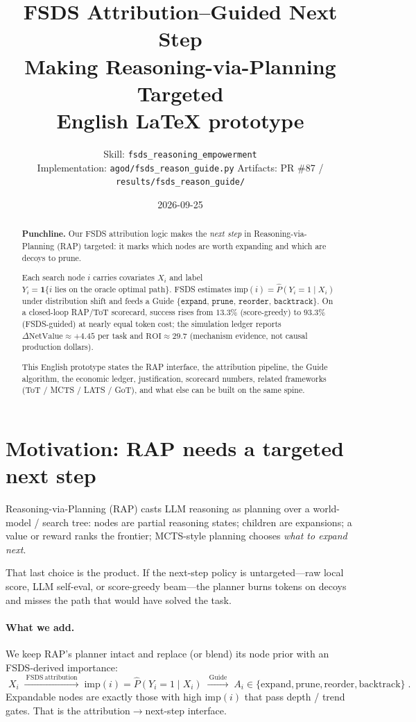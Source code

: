 \documentclass[11pt]{article}
\title{\textbf{FSDS Attribution--Guided Next Step}\\[0.4em]
\large Making Reasoning-via-Planning Targeted\\[0.15em]
\large English LaTeX prototype}
\author{Skill: \texttt{fsds\_reasoning\_empowerment}\\
Implementation: \texttt{agod/fsds\_reason\_guide.py} \quad
Artifacts: PR \#87 / \texttt{results/fsds\_reason\_guide/}}
\date{2026-09-25}
\newcommand{\imp}{\mathrm{imp}}
\newcommand{\NV}{\mathrm{NetValue}}
\newcommand{\ROI}{\mathrm{ROI}}
\newcommand{\ind}{\mathbf{1}}
\newcommand{\Phat}{\widehat{P}}
\begin{document}
\maketitle

\begin{abstract}
\textbf{Punchline.}
Our FSDS attribution logic makes the \emph{next step} in
Reasoning-via-Planning (RAP) targeted: it marks which nodes are worth
expanding and which are decoys to prune.

Each search node $i$ carries covariates $X_i$ and label
$Y_i=\ind\{i\text{ lies on the oracle optimal path}\}$.
FSDS estimates $\imp(i)=\Phat(Y_i{=}1\mid X_i)$ under distribution shift
and feeds a Guide
$\{\texttt{expand},\,\texttt{prune},\,\texttt{reorder},\,\texttt{backtrack}\}$.
On a closed-loop RAP/ToT scorecard, success rises from $13.3\%$
(score-greedy) to $93.3\%$ (FSDS-guided) at nearly equal token cost;
the simulation ledger reports
$\Delta\NV\approx{+}4.45$ per task and $\ROI\approx 29.7$
(mechanism evidence, not causal production dollars).

This English prototype states the RAP interface, the attribution
pipeline, the Guide algorithm, the economic ledger, justification,
scorecard numbers, related frameworks (ToT / MCTS / LATS / GoT), and
what else can be built on the same spine.
\end{abstract}

\tableofcontents
\vspace{1em}

\section{Motivation: RAP needs a targeted next step}
\label{sec:motivation}

Reasoning-via-Planning (RAP) \cite{hao2023rap} casts LLM reasoning as
planning over a world-model / search tree: nodes are partial reasoning
states; children are expansions; a value or reward ranks the frontier;
MCTS-style planning chooses \emph{what to expand next}.

That last choice is the product.
If the next-step policy is untargeted---raw local score, LLM
self-eval, or score-greedy beam---the planner burns tokens on decoys
and misses the path that would have solved the task.

\paragraph{What we add.}
We keep RAP's planner intact and replace (or blend) its node prior with
an FSDS-derived importance:
\begin{equation}
  \boxed{\;
    X_i
    \;\xrightarrow{\ \mathrm{FSDS\ attribution}\ }\;
    \imp(i)=\Phat(Y_i{=}1\mid X_i)
    \;\xrightarrow{\ \mathrm{Guide}\ }\;
    A_i\in\{\mathrm{expand},\mathrm{prune},\mathrm{reorder},\mathrm{backtrack}\}
  \;}.
  \label{eq:spine}
\end{equation}
Expandable nodes are exactly those with high $\imp(i)$ that pass depth /
trend gates. That is the attribution$\to$next-step interface.
\end{document}
